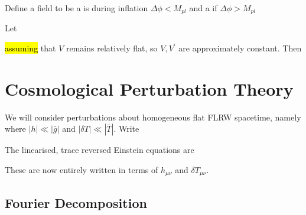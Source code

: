 \documentclass{article}
\begin{document}
\begin{definition}
Define a field to be a  is during inflation $\Delta \phi < M_{pl}$ and a  if $\Delta \phi > M_{pl}$
\end{definition}

\begin{definition}
Let 
\end{definition}
\hl{assuming} that $V$ remains relatively flat, so $V,V^\prime$ are approximately constant. Then 
\section{Cosmological Perturbation Theory}
We will consider perturbations about homogeneous flat FLRW spacetime, namely 
where $|h| \ll |\bar{g}|$ and $|\delta T| \ll |\bar{T}|$. Write 

\begin{theorem}
The linearised, trace reversed Einstein equations are 
\end{theorem}

These are now entirely written in terms of $h_{\mu\nu}$ and $\delta T_{\mu\nu}$. 
\subsection{Fourier Decomposition}
\end{document}

